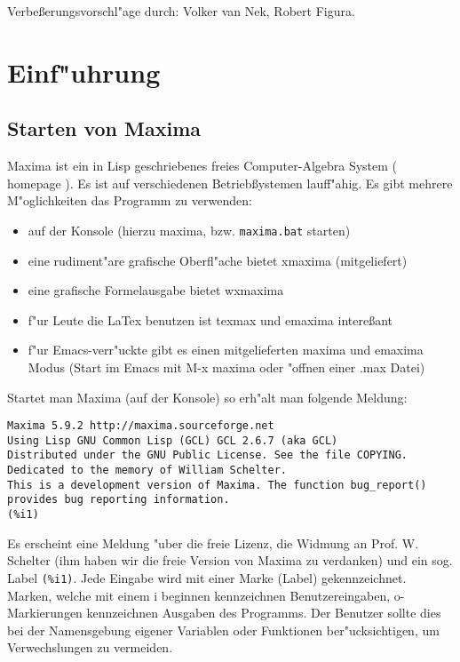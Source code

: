 \documentclass[spanish,12pt,a4paper]{article}
\begin{document}
Verbe{\ss}erungsvorschl"age durch: Volker van Nek, Robert Figura.

\section{Einf"uhrung}


\subsection{Starten von Maxima}

Maxima ist ein in Lisp geschriebenes freies Computer-Algebra System ( homepage ). Es ist auf verschiedenen Betrieb{\ss}ystemen lauff"ahig. Es gibt mehrere M"oglichkeiten das Programm zu verwenden:

\begin{itemize}
\item auf der Konsole (hierzu maxima, bzw. \verb|maxima.bat| starten)

\item eine rudiment"are grafische Oberfl"ache bietet xmaxima (mitgeliefert)

\item eine grafische Formelausgabe bietet wxmaxima

\item f"ur Leute die LaTex benutzen ist texmax und emaxima intere{\ss}ant

\item f"ur Emacs-verr"uckte gibt es einen mitgelieferten maxima und emaxima Modus (Start im Emacs mit M-x maxima oder "offnen einer .max Datei)
\end{itemize}

Startet man Maxima (auf der Konsole) so erh"alt man folgende Meldung:

\scriptsize
\begin{verbatim}
Maxima 5.9.2 http://maxima.sourceforge.net
Using Lisp GNU Common Lisp (GCL) GCL 2.6.7 (aka GCL)
Distributed under the GNU Public License. See the file COPYING.
Dedicated to the memory of William Schelter.
This is a development version of Maxima. The function bug_report()
provides bug reporting information.
(%i1)
\end{verbatim}
\normalsize

Es erscheint eine Meldung "uber die freie Lizenz, die Widmung an Prof. W. Schelter (ihm haben wir die freie Version von Maxima zu verdanken) und ein sog. Label  \verb|(%i1)|. Jede Eingabe wird mit einer Marke (Label) gekennzeichnet. Marken, welche mit einem i beginnen kennzeichnen Benutzereingaben, o-Markierungen kennzeichnen Ausgaben des Programms. Der Benutzer sollte dies bei der Namensgebung eigener Variablen oder Funktionen ber"ucksichtigen, um Verwechslungen zu vermeiden.
\end{document}
